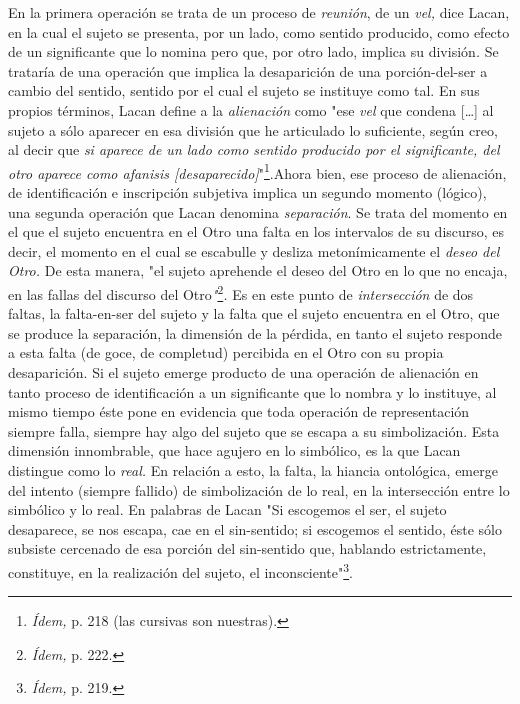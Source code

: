 \documentclass{book}
\begin{document}
En la primera operación se trata de un proceso de \emph{reunión}, de un
\emph{vel,} dice Lacan, en la cual el sujeto se presenta, por un lado,
como sentido producido, como efecto de un significante que lo nomina
pero que, por otro lado, implica su división\emph{.} Se trataría de una
operación que implica la desaparición de una porción-del-ser a cambio
del sentido, sentido por el cual el sujeto se instituye como tal. En sus
propios términos, Lacan define a la \emph{alienación} como "ese
\emph{vel} que condena {[}\ldots{]} al sujeto a sólo aparecer en esa
división que he articulado lo suficiente, según creo, al decir que
\emph{si aparece de un lado como sentido producido por el significante,
del otro aparece como afanisis {[}desaparecido{]}}"\footnote{\emph{Ídem,}
  p. 218 (las cursivas son nuestras).}.Ahora bien, ese proceso de
alienación, de identificación e inscripción subjetiva implica un segundo
momento (lógico), una segunda operación que Lacan denomina
\emph{separación}. Se trata del momento en el que el sujeto encuentra en
el Otro una falta en los intervalos de su discurso, es decir, el momento
en el cual se escabulle y desliza metonímicamente el \emph{deseo del
Otro.} De esta manera, "el sujeto aprehende el deseo del Otro en lo que
no encaja, en las fallas del discurso del
Otro\emph{"}\footnote{\emph{Ídem,} p. 222.}\emph{.} Es en este punto de
\emph{intersección} de dos faltas, la falta-en-ser del sujeto y la falta
que el sujeto encuentra en el Otro, que se produce la separación, la
dimensión de la pérdida, en tanto el sujeto responde a esta falta (de
goce, de completud) percibida en el Otro con su propia desaparición. Si
el sujeto emerge producto de una operación de alienación en tanto
proceso de identificación a un significante que lo nombra y lo
instituye, al mismo tiempo éste pone en evidencia que toda operación de
representación siempre falla, siempre hay algo del sujeto que se escapa
a su simbolización. Esta dimensión innombrable, que hace agujero en lo
simbólico, es la que Lacan distingue como lo \emph{real.} En relación a
esto, la falta, la hiancia ontológica, emerge del intento (siempre
fallido) de simbolización de lo real, en la intersección entre lo
simbólico y lo real. En palabras de Lacan "Si escogemos el ser, el
sujeto desaparece, se nos escapa, cae en el sin-sentido; si escogemos el
sentido, éste sólo subsiste cercenado de esa porción del sin-sentido
que, hablando estrictamente, constituye, en la realización del sujeto,
el inconsciente"\footnote{\emph{Ídem,} p. 219.}.
\end{document}
